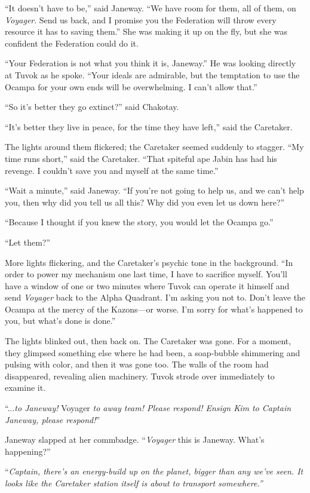 \documentclass[twoside,letterpaper,12pt]{memoir}
\begin{document}
``It doesn’t have to be,” said Janeway. ``We have room for them, all of them, on \textit{Voyager}. Send us back, and I promise you the Federation will throw every resource it has to saving them.” She was making it up on the fly, but she was confident the Federation could do it. 

``Your Federation is not what you think it is, Janeway.” He was looking directly at Tuvok as he spoke. ``Your ideals are admirable, but the temptation to use the Ocampa for your own ends will be overwhelming. I can’t allow that.” 

``So it’s better they go extinct?” said Chakotay. 

``It’s better they live in peace, for the time they have left,” said the Caretaker. 

The lights around them flickered; the Caretaker seemed suddenly to stagger. ``My time runs short,” said the Caretaker. ``That spiteful ape Jabin has had his revenge. I couldn’t save you and myself at the same time.” 

``Wait a minute,” said Janeway. ``If you’re not going to help us, and we can’t help you, then why did you tell us all this? Why did you even let us down here?” 

``Because I thought if you knew the story, you would let the Ocampa go.” 

``Let them?” 

More lights flickering, and the Caretaker’s psychic tone in the background. ``In order to power my mechanism one last time, I have to sacrifice myself. You’ll have a window of one or two minutes where Tuvok can operate it himself and send \textit{Voyager} back to the Alpha Quadrant. I’m asking you not to. Don’t leave the Ocampa at the mercy of the Kazons---or worse. I’m sorry for what’s happened to you, but what’s done is done.” 

The lights blinked out, then back on. The Caretaker was gone. For a moment, they glimpsed something else where he had been, a soap-bubble shimmering and pulsing with color, and then it was gone too. The walls of the room had disappeared, revealing alien machinery. Tuvok strode over immediately to examine it. 

``...\textit{to Janeway! }Voyager \textit{to away team! Please respond! Ensign Kim to Captain Janeway, please respond!}” 

Janeway slapped at her commbadge. ``\textit{Voyager }this is Janeway. What’s happening?” 

``\textit{Captain, there’s an energy-build up on the planet, bigger than any we’ve seen. It looks like the Caretaker station itself is about to transport somewhere.”} 
\end{document}
